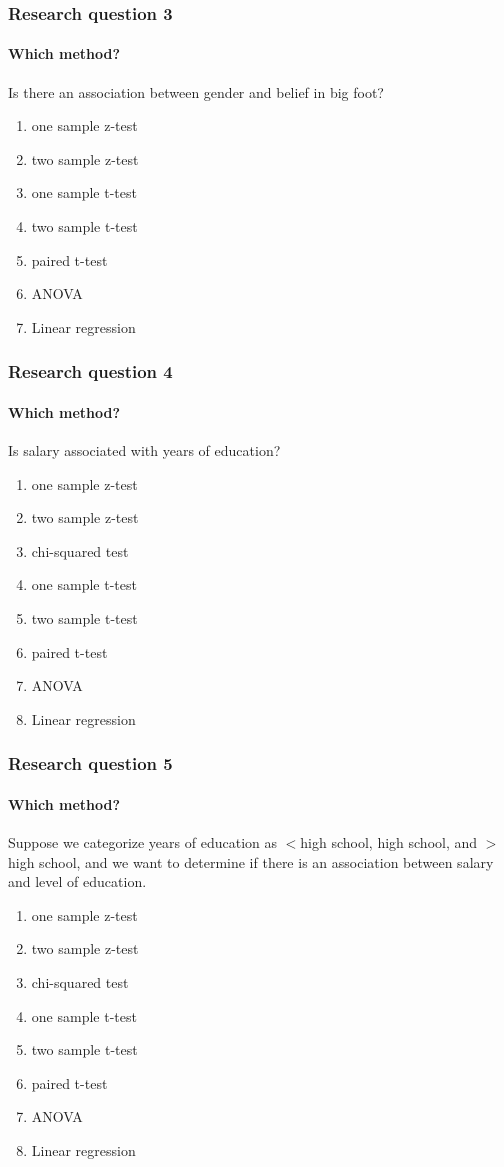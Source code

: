 \begin{frame}
\frametitle{Research question 3}
\framesubtitle{Which method?}
\begin{clicker}{Is there an association between gender and belief in big foot?}
\begin{enumerate}
    \item
    one sample z-test
    \item
    two sample z-test
    \item
    one sample t-test
    \item
    two sample t-test
    \item
    paired t-test
    \item
    ANOVA
    \item
    Linear regression
\end{enumerate}
\end{clicker}
\end{frame}



\begin{frame}
\frametitle{Research question 4}
\framesubtitle{Which method?}
\begin{clicker}{Is salary associated with years of education?}
\begin{enumerate}
    \item
    one sample z-test
    \item
    two sample z-test
    \item
    chi-squared test
    \item
    one sample t-test
    \item
    two sample t-test
    \item
    paired t-test
    \item
    ANOVA
    \item
    Linear regression
\end{enumerate}
\end{clicker}
\end{frame}

\begin{frame}
\frametitle{Research question 5}
\framesubtitle{Which method?}
\begin{clicker}{Suppose we categorize years of education as $<$high school, high school, and $>$high school, and we want to determine if there is an association between salary and level of education.}
\begin{enumerate}
    \item
    one sample z-test
    \item
    two sample z-test
    \item
    chi-squared test
    \item
    one sample t-test
    \item
    two sample t-test
    \item
    paired t-test
    \item
    ANOVA
    \item
    Linear regression
\end{enumerate}
\end{clicker}
\end{frame}


